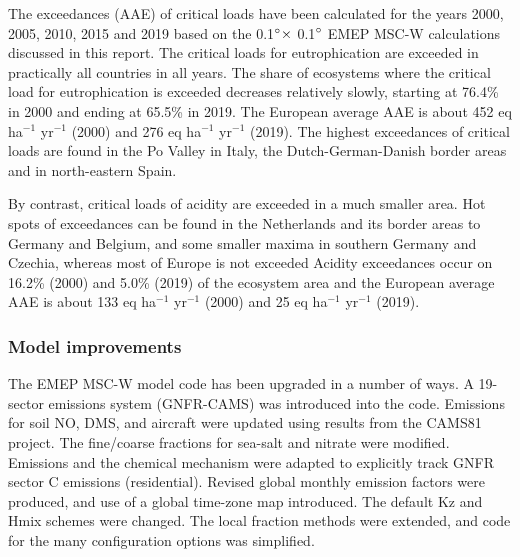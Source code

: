 The exceedances (AAE) of critical loads have been calculated for the years 2000, 2005, 2010, 2015 and 2019 based on the 0.1$^\circ \times$ 0.1$^\circ$ EMEP MSC-W calculations discussed in this report. The critical loads for eutrophication are exceeded in practically all countries in all years. The share of ecosystems where the critical load for eutrophication is exceeded decreases relatively slowly, starting at 76.4\% in 2000 and ending at 65.5\% in 2019. The European average AAE is about 452 eq ha$^{-1}$ yr$^{-1}$ (2000) and 276 eq
ha$^{-1}$ yr$^{-1}$ (2019). The highest exceedances of critical loads are found in the Po Valley in Italy, the
Dutch-German-Danish border areas and in north-eastern Spain.

By contrast, critical loads of acidity are exceeded in a much smaller area. Hot spots of
exceedances can be found in the Netherlands and its border areas to Germany and
Belgium, and some smaller maxima in southern Germany and Czechia, whereas most of Europe is not exceeded
Acidity exceedances occur
on 16.2\% (2000) and 5.0\% (2019) of the ecosystem area and the European average
AAE is about 133 eq ha$^{-1}$ yr$^{-1}$ (2000) and 25 eq ha$^{-1}$ yr$^{-1}$ (2019).









\subsubsection*{Model improvements} %

The EMEP MSC-W model code has been upgraded in a number of ways. 
A 19-sector emissions system (GNFR-CAMS) was introduced into the code. Emissions for soil NO, DMS, and aircraft were updated using results from the CAMS81 project. 
The  fine/coarse fractions for sea-salt and nitrate were modified. Emissions and the chemical mechanism were adapted to explicitly track GNFR sector C emissions (residential). Revised global monthly emission factors were produced, and use of a global time-zone map introduced. The default Kz and Hmix schemes were changed. The local fraction methods were extended, and code for the many configuration options was simplified. 





